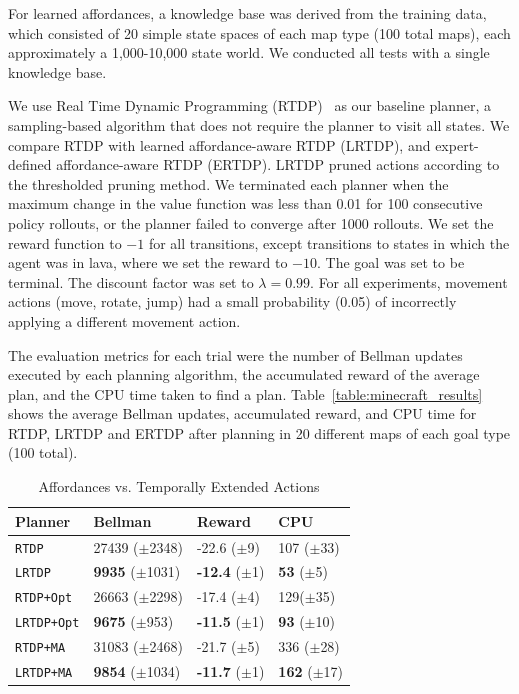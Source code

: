 \documentclass[letterpaper]{article}
\newcommand{\ra}[1]{\renewcommand{\arraystretch}{#1}} %
\begin{document}
For learned affordances, a knowledge base was derived from the training data, which consisted of 20 simple state spaces of each map type
(100 total maps), each approximately a 1,000-10,000 state world. We
conducted all tests with a single knowledge base. 

We use Real Time Dynamic Programming
(RTDP)~\cite{barto95} as our baseline planner, a sampling-based algorithm that does
not require the planner to visit all states. We compare RTDP with learned affordance-aware RTDP (LRTDP), and
expert-defined affordance-aware RTDP (ERTDP). LRTDP pruned actions according to the thresholded pruning method.
We terminated each planner when the maximum change in the value
function was less than 0.01 for 100 consecutive policy rollouts, or
the planner failed to converge after 1000 rollouts.  We set the reward
function to $-1$ for all transitions, except transitions to states in
which the agent was in lava, where we set the reward to $-10$. The goal was set to
be terminal. The discount factor was set to $\lambda = 0.99$. For all
experiments, movement actions (move, rotate, jump) had a small
probability (0.05) of incorrectly applying a different movement
action.

The evaluation metrics for each trial were the number of Bellman updates
executed by each planning algorithm, the accumulated reward
of the average plan, and the CPU time taken to find a
plan. Table~\ref{table:minecraft_results} shows the average Bellman
updates, accumulated reward, and CPU time for RTDP, LRTDP and ERTDP
after planning in 20 different maps of each goal type (100
total). 

\begin{table}[b]
\ra{1.25}
\begin{tabular}{@{}llll@{}}\toprule
Planner & Bellman & Reward & CPU \\ \midrule
\texttt{RTDP}   			&	27439 ($\pm$2348)		&	-22.6 ($\pm$9)		& 107 ($\pm$33) \\
\texttt{LRTDP} 			& 	{\bf 9935} ($\pm$1031)	&	{\bf -12.4} ($\pm$1)& {\bf 53} ($\pm$5) \\ \hline
\texttt{RTDP+Opt}  		&	26663 ($\pm$2298)		&	-17.4 ($\pm$4) 		& 129($\pm$35) \\
\texttt{LRTDP+Opt} 		& 	{\bf 9675} ($\pm$953)	&	{\bf -11.5} ($\pm$1)	&{\bf 93} ($\pm$10) \\ \hline
\texttt{RTDP+MA}  		&	31083 ($\pm$2468)		&	-21.7	 ($\pm$5)		&336 ($\pm$28) \\
\texttt{LRTDP+MA}  		& 	{\bf 9854} ($\pm$1034)	&	{\bf -11.7} ($\pm$1)	&{\bf 162} ($\pm$17) \\ %
\bottomrule
\end{tabular}
\caption{Affordances vs. Temporally Extended Actions}
\label{table:temp_ext_act_results}
\end{table}
\end{document}
